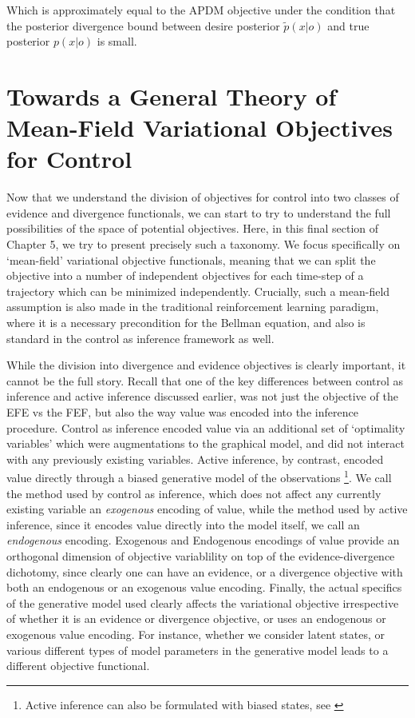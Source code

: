 Which is approximately equal to the APDM objective under the condition that the posterior divergence bound between desire posterior $\tilde{p}(x | o)$ and true posterior $p(x | o)$ is small.

\section{Towards a General Theory of Mean-Field Variational Objectives for Control}

Now that we understand the division of objectives for control into two classes of evidence and divergence functionals, we can start to try to understand the full possibilities of the space of potential objectives. Here, in this final section of Chapter 5, we try to present precisely such a taxonomy. We focus specifically on `mean-field' variational objective functionals, meaning that we can split the objective into a number of independent objectives for each time-step of a trajectory which can be minimized independently. Crucially, such a mean-field assumption is also made in the traditional reinforcement learning paradigm, where it is a necessary precondition for the Bellman equation, and also is standard in the control as inference framework as well.

While the division into divergence and evidence objectives is clearly important, it cannot be the full story. Recall that one of the key differences between control as inference and active inference discussed earlier, was not just the objective of the EFE vs the FEF, but also the way value was encoded into the inference procedure. Control as inference encoded value via an additional set of `optimality variables' which were augmentations to the graphical model, and did not interact with any previously existing variables. Active inference, by contrast, encoded value directly through a biased generative model of the observations \footnote{Active inference can also be formulated with biased states, see  \citep{da2020active}}. We call the method used by control as inference, which does not affect any currently existing variable an \emph{exogenous} encoding of value, while the method used by active inference, since it encodes value directly into the model itself, we call an \emph{endogenous} encoding. Exogenous and Endogenous encodings of value provide an orthogonal dimension of objective variablility on top of the evidence-divergence dichotomy, since clearly one can have an evidence, or a divergence objective with both an endogenous or an exogenous value encoding. Finally, the actual specifics of the generative model used clearly affects the variational objective irrespective of whether it is an evidence or divergence objective, or uses an endogenous or exogenous value encoding. For instance, whether we consider latent states, or various different types of model parameters in the generative model leads to a different objective functional. 

